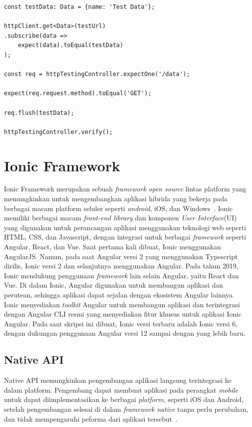 \begin{enumerate}
	
\begin{lstlisting}[label={lst:httpclientsubscribe}, caption={Contoh \textit{Routing} pada Angular}]
const testData: Data = {name: 'Test Data'};

httpClient.get<Data>(testUrl)
.subscribe(data =>
	expect(data).toEqual(testData)
);

const req = httpTestingController.expectOne('/data');

expect(req.request.method).toEqual('GET');
  
req.flush(testData);

httpTestingController.verify();

\end{lstlisting}
\end{enumerate}


\section{Ionic Framework}
\label{sec:ionicframework} 
 
Ionic Framework merupakan sebuah {\it framework open source} lintas platform yang memungkinkan untuk mengembangkan aplikasi hibrida yang bekerja pada berbagai macam platform seluler seperti {\it android}, iOS, dan Windows~\cite{waranashiwar:18:ionic}. Ionic memiliki berbagai macam \textit{front-end library} dan komponen \textit{User Interface}(UI) yang digunakan untuk  perancangan aplikasi menggunakan teknologi web seperti HTML, CSS, dan Javascript, dengan integrasi untuk berbagai \textit{framework} seperti Angular, React, dan Vue. Saat pertama kali dibuat, Ionic menggunakan AngularJS. Namun, pada saat Angular versi 2 yang menggunakan Typescript dirilis, Ionic versi 2 dan selanjutnya menggunakan Angular. Pada tahun 2019, Ionic mendukung penggunaan \textit{framework} lain selain Angular, yaitu React dan Vue. Di dalam Ionic, Angular digunakan untuk membangun aplikasi dan perutean, sehingga aplikasi dapat sejalan dengan ekosistem Angular lainnya. Ionic menyediakan {\it toolkit} Angular untuk membangun aplikasi dan terintegrasi dengan Angular CLI resmi yang menyediakan fitur khusus untuk aplikasi Ionic Angular. Pada saat skripsi ini dibuat, Ionic versi terbaru adalah Ionic versi 6, dengan dukungan penggunaan Angular versi 12 sampai dengan yang lebih baru.  

\subsection{Native API}
\label{subsec:nativeApi}
Native API memungkinkan pengembangan aplikasi langsung terintegrasi ke dalam platform. Pengembang dapat membuat aplikasi pada perangkat {\it mobile} untuk dapat diimplementasikan ke berbagai {\it platform}, seperti iOS dan Android, setelah pengembangan selesai di dalam {\it framework native} tanpa perlu perubahan, dan tidak mempengaruhi peforma dari aplikasi tersebut~\cite{griffith:17:mobile}. 



